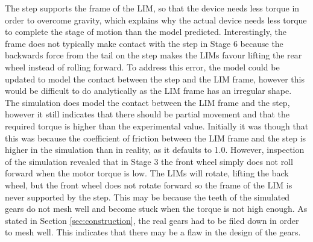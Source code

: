 The step supports the frame of the LIM, so that the device needs less torque in order to overcome gravity, which explains why the actual device needs less torque to complete the stage of motion than the model predicted. Interestingly, the frame does not typically make contact with the step in Stage 6 because the backwards force from the tail on the step makes the LIMs favour lifting the rear wheel instead of rolling forward. To address this error, the model could be updated to model the contact between the step and the LIM frame, however this would be difficult to do analytically as the LIM frame has an irregular shape. \\
The simulation does model the contact between the LIM frame and the step, however it still indicates that there should be partial movement and that the required torque is higher than the experimental value. Initially it was though that this was because the coefficient of friction between the LIM frame and the step is higher in the simulation than in reality, as it defaults to 1.0. However, inspection of the simulation revealed that in Stage 3 the front wheel simply does not roll forward when the motor torque is low. The LIMs will rotate, lifting the back wheel, but the front wheel does not rotate forward so the frame of the LIM is never supported by the step. This may be because the teeth of the simulated gears do not mesh well and become stuck when the torque is not high enough. As stated in Section \ref{sec:construction}, the real gears had to be filed down in order to mesh well. This indicates that there may be a flaw in the design of the gears.\\

